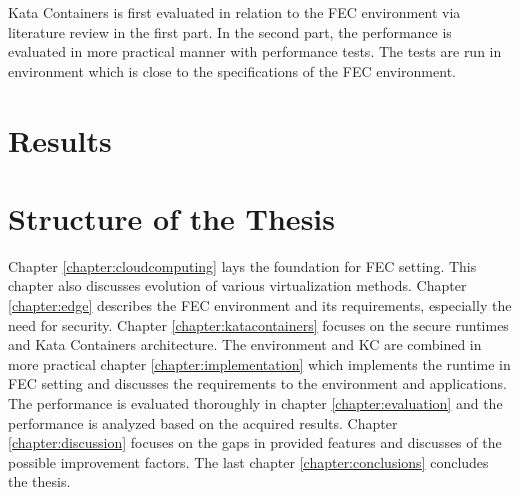 Kata Containers is first evaluated in relation to the FEC environment via literature review in the first part. In the second part, the performance is evaluated in more practical manner with performance tests. The tests are run in environment which is close to the specifications of the FEC environment.

\section{Results}
\label{section:intro_results}


\section{Structure of the Thesis}
\label{section:intro_structure}

Chapter \ref{chapter:cloudcomputing} lays the foundation for FEC setting. This chapter also discusses evolution of various virtualization methods. Chapter \ref{chapter:edge} describes the FEC environment and its requirements, especially the need for security. Chapter \ref{chapter:katacontainers} focuses on the secure runtimes and Kata Containers architecture. The environment and KC are combined in more practical chapter \ref{chapter:implementation} which implements the runtime in FEC setting and discusses the requirements to the environment and applications. The performance is evaluated thoroughly in chapter \ref{chapter:evaluation} and the performance is analyzed based on the acquired results. Chapter \ref{chapter:discussion} focuses on the gaps in provided features and discusses of the possible improvement factors. The last chapter \ref{chapter:conclusions} concludes the thesis.


